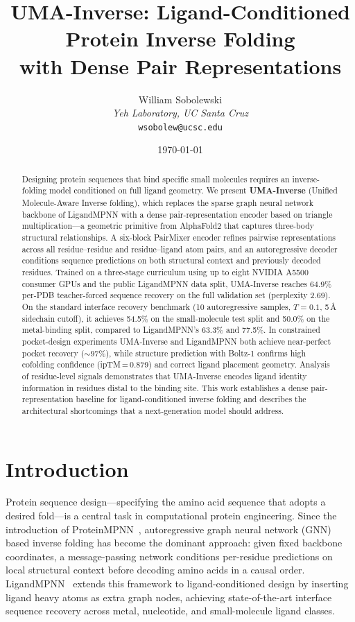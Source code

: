 \documentclass[11pt,letterpaper]{article}
\title{\textbf{UMA-Inverse: Ligand-Conditioned Protein Inverse Folding\\
       with Dense Pair Representations}}
\author{William Sobolewski\\
        \textit{Yeh Laboratory, UC Santa Cruz}\\
        \texttt{wsobolew@ucsc.edu}}
\date{\today}
\begin{document}
\maketitle
\begin{abstract}
Designing protein sequences that bind specific small molecules requires an inverse-folding model
conditioned on full ligand geometry. We present \textbf{UMA-Inverse} (Unified Molecule-Aware Inverse
folding), which replaces the sparse graph neural network backbone of LigandMPNN with a dense
pair-representation encoder based on triangle multiplication—a geometric primitive from
AlphaFold2 that captures three-body structural relationships. A six-block PairMixer encoder refines
pairwise representations across all residue--residue and residue--ligand atom pairs, and an
autoregressive decoder conditions sequence predictions on both structural context and previously
decoded residues. Trained on a three-stage curriculum using up to eight NVIDIA A5500 consumer GPUs
and the public LigandMPNN data split, UMA-Inverse reaches 64.9\% per-PDB teacher-forced sequence
recovery on the full validation set (perplexity 2.69). On the standard interface recovery benchmark
(10 autoregressive samples, $T{=}0.1$, 5\,{\AA} sidechain cutoff), it achieves 54.5\% on the
small-molecule test split and 50.0\% on the metal-binding split, compared to LigandMPNN's
63.3\% and 77.5\%. In constrained pocket-design experiments UMA-Inverse and LigandMPNN both
achieve near-perfect pocket recovery (${\sim}97\%$), while structure prediction with Boltz-1
confirms high cofolding confidence (ipTM\,=\,0.879) and correct ligand placement geometry.
Analysis of residue-level signals demonstrates that UMA-Inverse encodes ligand identity information
in residues distal to the binding site. This work establishes a dense pair-representation baseline
for ligand-conditioned inverse folding and describes the architectural shortcomings that a
next-generation model should address.
\end{abstract}

\section{Introduction}

Protein sequence design---specifying the amino acid sequence that adopts a desired fold---is a
central task in computational protein engineering. Since the introduction of
ProteinMPNN~\citep{dauparas2022robust}, autoregressive graph neural network (GNN) based inverse
folding has become the dominant approach: given fixed backbone coordinates, a message-passing
network conditions per-residue predictions on local structural context before decoding amino acids
in a causal order. LigandMPNN~\citep{dauparas2023atomic} extends this framework to
ligand-conditioned design by inserting ligand heavy atoms as extra graph nodes, achieving state-of-the-art
interface sequence recovery across metal, nucleotide, and small-molecule ligand classes.
\end{document}

